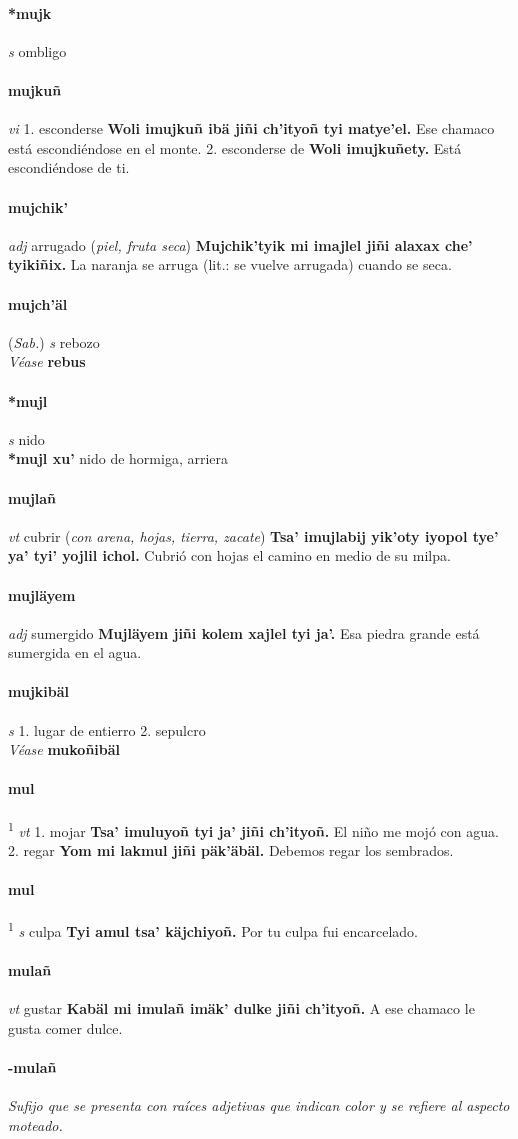 \documentclass{scrbook}
\newcommand{\entry}[1]{\paragraph{#1}}
\newcommand{\onedefinition}[1]{#1.}
\newcommand{\defsuperscript}[1]{\textsuperscript{1}}
\newcommand{\nontranslationdef}[1]{\textit{#1}}
\newcommand{\partofspeech}[1]{\textit{#1}}
\newcommand{\spanishtranslation}[1]{#1}
\newcommand{\clarification}[1]{(\textit{#1})}
\newcommand{\cholexample}[1]{\textbf{#1}}
\newcommand{\exampletranslation}[1]{#1}
\newcommand{\alsosee}[1]{\\\textit{Véase} \textbf{#1}}
\newcommand{\relevantdialect}[1]{(\textit{#1})}
\newcommand{\secondaryentry}[1]{\\\textbf{#1}}
\newcommand{\secondtranslation}[1]{#1}
\begin{document}
\begin{multicols}{2}
\entry{*mujk}
\partofspeech{s}
\spanishtranslation{ombligo}

\entry{mujkuñ}
\partofspeech{vi}
\onedefinition{1}
\spanishtranslation{esconderse}
\cholexample{Woli imujkuñ ibä jiñi ch'ityoñ tyi matye'el.}
\exampletranslation{Ese chamaco está escondiéndose en el monte.}
\onedefinition{2}
\spanishtranslation{esconderse de}
\cholexample{Woli imujkuñety.}
\exampletranslation{Está escondiéndose de ti.}

\entry{mujchik'}
\partofspeech{adj}
\spanishtranslation{arrugado}
\clarification{piel, fruta seca}
\cholexample{Mujchik'tyik mi imajlel jiñi alaxax che' tyikiñix.}
\exampletranslation{La naranja se arruga (lit.: se vuelve arrugada) cuando se seca.}

\entry{mujch'äl}
\relevantdialect{Sab.}
\partofspeech{s}
\spanishtranslation{rebozo}
\alsosee{rebus}

\entry{*mujl}
\partofspeech{s}
\spanishtranslation{nido}
\secondaryentry{*mujl xu'}
\secondtranslation{nido de hormiga, arriera}

\entry{mujlañ}
\partofspeech{vt}
\spanishtranslation{cubrir}
\clarification{con arena, hojas, tierra, zacate}
\cholexample{Tsa' imujlabij yik'oty iyopol tye' ya' tyi' yojlil ichol.}
\exampletranslation{Cubrió con hojas el camino en medio de su milpa.}

\entry{mujläyem}
\partofspeech{adj}
\spanishtranslation{sumergido}
\cholexample{Mujläyem jiñi kolem xajlel tyi ja'.}
\exampletranslation{Esa piedra grande está sumergida en el agua.}

\entry{mujkibäl}
\partofspeech{s}
\onedefinition{1}
\spanishtranslation{lugar de entierro}
\onedefinition{2}
\spanishtranslation{sepulcro}
\alsosee{mukoñibäl}

\entry{mul}
\defsuperscript{1}
\partofspeech{vt}
\onedefinition{1}
\spanishtranslation{mojar}
\cholexample{Tsa' imuluyoñ tyi ja' jiñi ch'ityoñ.}
\exampletranslation{El niño me mojó con agua.}
\onedefinition{2}
\spanishtranslation{regar}
\cholexample{Yom mi lakmul jiñi päk'äbäl.}
\exampletranslation{Debemos regar los sembrados.}

\entry{mul}
\defsuperscript{2}
\partofspeech{s}
\spanishtranslation{culpa}
\cholexample{Tyi amul tsa' käjchiyoñ.}
\exampletranslation{Por tu culpa fui encarcelado.}

\entry{mulañ}
\partofspeech{vt}
\spanishtranslation{gustar}
\cholexample{Kabäl mi imulañ imäk' dulke jiñi ch'ityoñ.}
\exampletranslation{A ese chamaco le gusta comer dulce.}

\entry{-mulañ}
\nontranslationdef{Sufijo que se presenta con raíces adjetivas que indican color y se refiere al aspecto moteado.}


\end{multicols}
\end{document}
